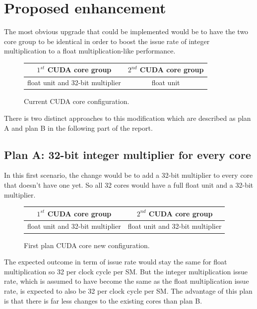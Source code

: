 \documentclass{report}
\begin{document}
   \section{Proposed enhancement}
   The most obvious upgrade that could be implemented would be to have the two core group to be identical in order to boost the issue rate of integer multiplication to a float multiplication-like performance.
   \begin{figure}[H]
      \centering
       \begin{tabular}{ | c | c | }
    	    \hline
    	    $1^{st}$ CUDA core group & $2^{nd}$ CUDA core group \\ \hline
    	   float unit and 32-bit multiplier & float unit \\ \hline
  	\end{tabular}
  	\captionsetup{justification=centering}
  	\caption{Current CUDA core configuration.}
  	\label{fig:current_cores}
   \end{figure}
   There is two distinct approaches to this modification which are described as plan A and plan B in the following part of the report.
   \subsection{Plan A: 32-bit integer multiplier for every core}
    In this first scenario, the change would be to add a 32-bit multiplier to every core that doesn't have one yet. So all 32 cores would have a full float unit and a 32-bit multiplier.
    \begin{figure}[H]
      \centering
       \begin{tabular}{ | c | c | }
    	    \hline
    	    $1^{st}$ CUDA core group & $2^{nd}$ CUDA core group \\ \hline
    	   float unit and 32-bit multiplier & float unit and 32-bit multiplier \\ \hline
  	\end{tabular}
  	\captionsetup{justification=centering}
  	\caption{First plan CUDA core new configuration.}
  	\label{fig:planA_cores}
   \end{figure}
    The expected outcome in term of issue rate would stay the same for float multiplication so 32 per clock cycle per SM. But the integer multiplication issue rate, which is assumed to have become the same as the float multiplication issue rate, is expected to also be 32 per clock cycle per SM.
    The advantage of this plan is that there is far less changes to the existing cores than plan B.
\end{document}
